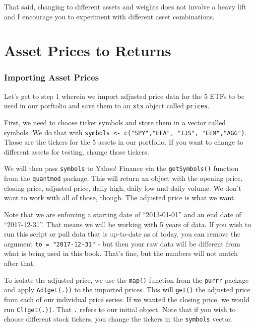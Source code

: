 \documentclass[]{krantz}
\begin{document}
That said, changing to different assets and weights does not involve a
heavy lift and I encourage you to experiment with different asset
combinations.

\chapter{Asset Prices to Returns}\label{asset-prices-to-returns}

\subsection*{Importing Asset Prices}\label{importing-asset-prices}


Let's get to step 1 wherein we import adjusted price data for the 5 ETFs
to be used in our porftolio and save them to an \texttt{xts} object
called \texttt{prices}.

First, we need to choose ticker symbols and store them in a vector
called symbols. We do that with
\texttt{symbols\ \textless{}-\ c("SPY","EFA",\ "IJS",\ "EEM","AGG")}.
Those are the tickers for the 5 assets in our portfolio. If you want to
change to different assets for testing, change those tickers.

We will then pass \texttt{symbols} to Yahoo! Finance via the
\texttt{getSymbols()} function from the \texttt{quantmod} package. This
will return an object with the opening price, closing price, adjusted
price, daily high, daily low and daily volume. We don't want to work
with all of those, though. The adjusted price is what we want.

Note that we are enforcing a starting date of ``2013-01-01'' and an end
date of ``2017-12-31''. That means we will be working with 5 years of
data. If you wish to run this script or pull data that is up-to-date as
of today, you can remove the argument \texttt{to\ =\ "2017-12-31"} - but
then your raw data will be different from what is being used in this
book. That's fine, but the numbers will not match after that.

To isolate the adjusted price, we use the \texttt{map()} function from
the \texttt{purrr} package and apply \texttt{Ad(get(.))} to the imported
prices. This will \texttt{get()} the adjusted price from each of our
individual price series. If we wanted the closing price, we would run
\texttt{Cl(get(.))}. That \texttt{.} refers to our initial object. Note
that if you wish to choose different stock tickers, you change the
tickers in the \texttt{symbols} vector.
\end{document}
